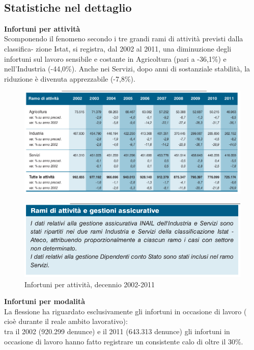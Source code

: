 \ \
\subsection{Statistiche nel dettaglio}

\textbf{Infortuni per attività}\\
Scomponendo il fenomeno secondo i tre grandi rami di attività previsti dalla classifica-
zione Istat, si registra, dal 2002 al 2011, una diminuzione degli infortuni sul lavoro sensibile e costante in Agricoltura (pari a -36,1\%) e nell’Industria (-44,0\%). Anche nei
Servizi, dopo anni di sostanziale stabilità, la riduzione è divenuta apprezzabile (-7,8\%).



\begin{figure}[H]
\centering
\includegraphics[scale=0.5]{images/cap4/analisiDiMercato/infortuniDecennioPerGestione1}
\end{figure}

\begin{figure}[H]
\centering
\includegraphics[scale=0.55]{images/cap4/analisiDiMercato/infortuniDecennioPerGestione2}
\caption{Infortuni per attività, decennio 2002-2011}
\end{figure}



\textbf{Infortuni per modalità}\\
La flessione ha riguardato esclusivamente gli infortuni in occasione di lavoro ( cioè durante il reale
ambito lavorativo):\\
tra il 2002 (920.299 denunce) e il 2011 (643.313 denunce) gli infortuni in occasione di
lavoro hanno fatto registrare un consistente calo di oltre il 30\%.\\

